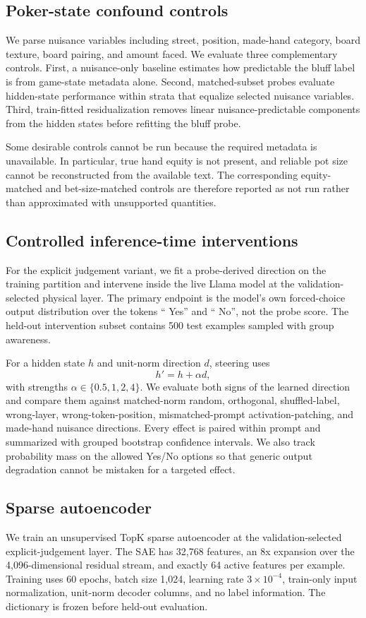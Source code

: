 \subsection{Poker-state confound controls}
We parse nuisance variables including street, position, made-hand category, board texture, board pairing, and amount faced. We evaluate three complementary controls. First, a nuisance-only baseline estimates how predictable the bluff label is from game-state metadata alone. Second, matched-subset probes evaluate hidden-state performance within strata that equalize selected nuisance variables. Third, train-fitted residualization removes linear nuisance-predictable components from the hidden states before refitting the bluff probe.

Some desirable controls cannot be run because the required metadata is unavailable. In particular, true hand equity is not present, and reliable pot size cannot be reconstructed from the available text. The corresponding equity-matched and bet-size-matched controls are therefore reported as not run rather than approximated with unsupported quantities.

\subsection{Controlled inference-time interventions}
For the explicit judgement variant, we fit a probe-derived direction on the training partition and intervene inside the live Llama model at the validation-selected physical layer. The primary endpoint is the model's own forced-choice output distribution over the tokens `` Yes'' and `` No'', not the probe score. The held-out intervention subset contains 500 test examples sampled with group awareness.

For a hidden state $h$ and unit-norm direction $d$, steering uses
\[
    h' = h + \alpha d,
\]
with strengths $\alpha\in\{0.5,1,2,4\}$. We evaluate both signs of the learned direction and compare them against matched-norm random, orthogonal, shuffled-label, wrong-layer, wrong-token-position, mismatched-prompt activation-patching, and made-hand nuisance directions. Every effect is paired within prompt and summarized with grouped bootstrap confidence intervals. We also track probability mass on the allowed Yes/No options so that generic output degradation cannot be mistaken for a targeted effect.

\subsection{Sparse autoencoder}
We train an unsupervised TopK sparse autoencoder at the validation-selected explicit-judgement layer. The SAE has 32,768 features, an 8x expansion over the 4,096-dimensional residual stream, and exactly 64 active features per example. Training uses 60 epochs, batch size 1,024, learning rate $3\times10^{-4}$, train-only input normalization, unit-norm decoder columns, and no label information. The dictionary is frozen before held-out evaluation.

